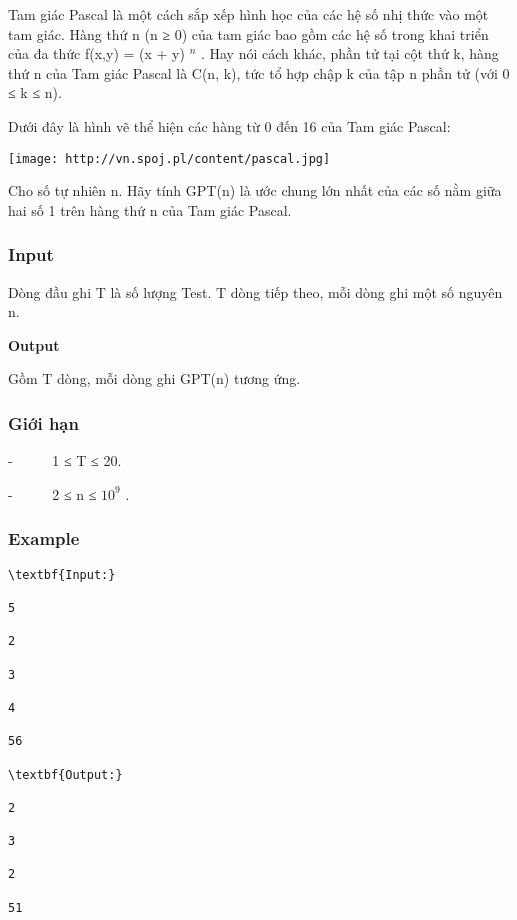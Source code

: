 



   Tam giác Pascal là một cách sắp xếp hình học của các hệ số nhị thức vào một tam giác. Hàng thứ n (n ≥ 0) của tam giác bao gồm các hệ số trong khai triển của đa thức f(x,y) = (x + y)   $^    n   $   . Hay nói cách khác, phần tử tại cột thứ k, hàng thứ n của Tam giác Pascal là C(n, k), tức tổ hợp chập k của tập n phần tử (với 0 ≤ k ≤ n).  

   Dưới đây là hình vẽ thể hiện các hàng từ 0 đến 16 của Tam giác Pascal:  


\texttt{[image: http://vn.spoj.pl/content/pascal.jpg]}



   Cho số tự nhiên n. Hãy tính GPT(n) là ước chung lớn nhất của các số nằm giữa hai số 1 trên hàng thứ n của Tam giác Pascal.  

\subsubsection{   Input  }

   Dòng đầu ghi T là số lượng Test. T dòng tiếp theo, mỗi dòng ghi một số nguyên n.  

\textbf{    Output   }

   Gồm T dòng, mỗi dòng ghi GPT(n) tương ứng.  

\subsubsection{\textbf{    Giới hạn   }}

   -       1 ≤ T ≤ 20.  

   -       2 ≤ n ≤ $10^{9}$   .  

\subsubsection{   Example  }
\begin{verbatim}
\textbf{Input:}

5

2

3

4

56

\textbf{Output:}

2

3

2

51\end{verbatim}
